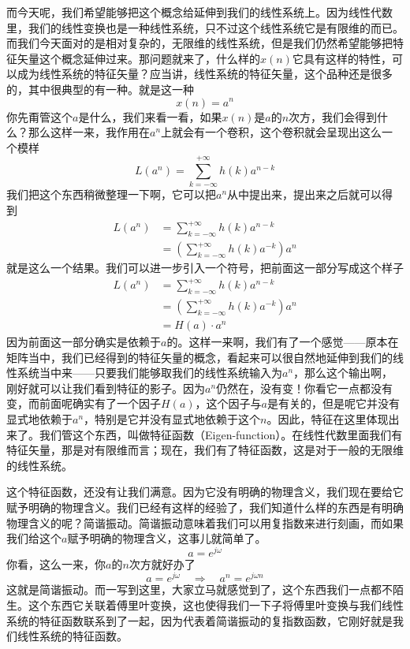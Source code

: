 \documentclass[a4paper,12pt]{article}
\begin{document}
而今天呢，我们希望能够把这个概念给延伸到我们的线性系统上。因为线性代数里，我们的线性变换也是一种线性系统，只不过这个线性系统它是有限维的而已。而我们今天面对的是相对复杂的，无限维的线性系统，但是我们仍然希望能够把特征矢量这个概念延伸过来。那问题就来了，什么样的$x(n)$它具有这样的特性，可以成为线性系统的特征矢量？应当讲，线性系统的特征矢量，这个品种还是很多的，其中很典型的有一种。就是这一种
\begin{equation}
   x(n) = a^n
\end{equation}
你先甭管这个$a$是什么，我们来看一看，如果$x(n)$是$a$的$n$次方，我们会得到什么？那么这样一来，我作用在$a^n$上就会有一个卷积，这个卷积就会呈现出这么一个模样
\begin{equation}
   L\left ( a^n \right ) = \sum_{k=-\infty}^{+\infty}h(k)a^{n-k}
\end{equation}
我们把这个东西稍微整理一下啊，它可以把$a^n$从中提出来，提出来之后就可以得到
\begin{equation}
\begin{aligned}
   L\left ( a^n \right ) &= \sum_{k=-\infty}^{+\infty}h(k)a^{n-k}\\
&= \left ( \sum_{k=-\infty}^{+\infty}h(k)a^{-k} \right )a^n
\end{aligned}
\end{equation}
就是这么一个结果。我们可以进一步引入一个符号，把前面这一部分写成这个样子
\begin{equation}
\begin{aligned}
   L\left ( a^n \right ) &= \sum_{k=-\infty}^{+\infty}h(k)a^{n-k}\\
&= \left ( \sum_{k=-\infty}^{+\infty}h(k)a^{-k} \right )a^n\\
&= H(a)\cdot a^n
\end{aligned}
\end{equation}
因为前面这一部分确实是依赖于$a$的。这样一来啊，我们有了一个感觉——原本在矩阵当中，我们已经得到的特征矢量的概念，看起来可以很自然地延伸到我们的线性系统当中来——只要我们能够取我们的线性系统输入为$a^n$，那么这个输出啊，刚好就可以让我们看到特征的影子。因为$a^n$仍然在，没有变！你看它一点都没有变，而前面呢确实有了一个因子$H(a)$，这个因子与$a$是有关的，但是呢它并没有显式地依赖于$a^n$，特别是它并没有显式地依赖于这个$n$。因此，特征在这里体现出来了。我们管这个东西，叫做特征函数（Eigen-function）。在线性代数里面我们有特征矢量，那是对有限维而言；现在，我们有了特征函数，这是对于一般的无限维的线性系统。

这个特征函数，还没有让我们满意。因为它没有明确的物理含义，我们现在要给它赋予明确的物理含义。我们已经有这样的经验了，我们知道什么样的东西是有明确物理含义的呢？简谐振动。简谐振动意味着我们可以用复指数来进行刻画，而如果我们给这个$a$赋予明确的物理含义，这事儿就简单了。
\begin{equation}
   a = e^{j \omega}
\end{equation}
你看，这么一来，你$a$的$n$次方就好办了
\begin{equation}
   a = e^{j \omega}\quad \Longrightarrow \quad a^n = e^{j\omega n}
\end{equation}
这就是简谐振动。而一写到这里，大家立马就感觉到了，这个东西我们一点都不陌生。这个东西它关联着傅里叶变换，这也使得我们一下子将傅里叶变换与我们线性系统的特征函数联系到了一起，因为代表着简谐振动的复指数函数，它刚好就是我们线性系统的特征函数。
\end{document}
